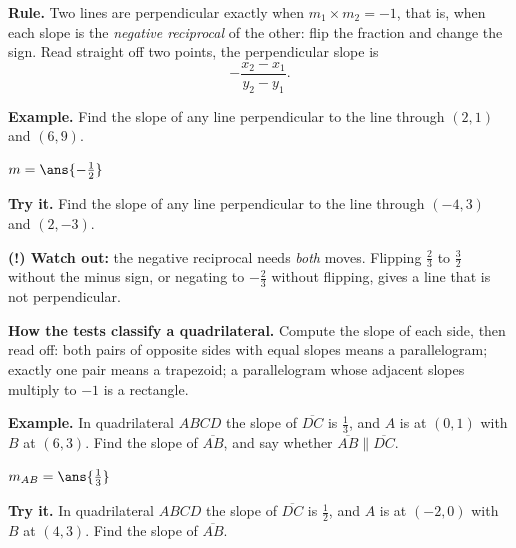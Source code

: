 \documentclass[12pt]{article}
\begin{document}

\begin{formulabox}
\textbf{Rule.} Two lines are perpendicular exactly when
$m_1 \times m_2 = -1$, that is, when each slope is the \emph{negative
reciprocal} of the other: flip the fraction and change the sign. Read straight
off two points, the perpendicular slope is
\[ -\frac{x_2-x_1}{y_2-y_1}. \]
\end{formulabox}

\begin{examplebox}
\textbf{Example.} Find the slope of any line perpendicular to the line through
$(2,1)$ and $(6,9)$.

$m = \ans{-\tfrac{1}{2}}$
\end{examplebox}

\begin{tryitbox}
\textbf{Try it.} Find the slope of any line perpendicular to the line through
$(-4,3)$ and $(2,-3)$.\\[2pt]
\end{tryitbox}

\begin{watchoutbox}
\textbf{(!) Watch out:} the negative reciprocal needs \emph{both} moves. Flipping
$\tfrac{2}{3}$ to $\tfrac{3}{2}$ without the minus sign, or negating to
$-\tfrac{2}{3}$ without flipping, gives a line that is not perpendicular.
\end{watchoutbox}


\begin{formulabox}
\textbf{How the tests classify a quadrilateral.} Compute the slope of each side,
then read off: both pairs of opposite sides with equal slopes means a
parallelogram; exactly one pair means a trapezoid; a parallelogram whose
adjacent slopes multiply to $-1$ is a rectangle.
\end{formulabox}

\begin{examplebox}
\textbf{Example.} In quadrilateral $ABCD$ the slope of $\overline{DC}$ is
$\tfrac{1}{3}$, and $A$ is at $(0,1)$ with $B$ at $(6,3)$. Find the slope of
$\overline{AB}$, and say whether $\overline{AB} \parallel \overline{DC}$.

$m_{AB} = \ans{\tfrac{1}{3}}$
\end{examplebox}

\begin{tryitbox}
\textbf{Try it.} In quadrilateral $ABCD$ the slope of $\overline{DC}$ is
$\tfrac{1}{2}$, and $A$ is at $(-2,0)$ with $B$ at $(4,3)$. Find the slope of
$\overline{AB}$.\\[2pt]
\end{tryitbox}
\end{document}
